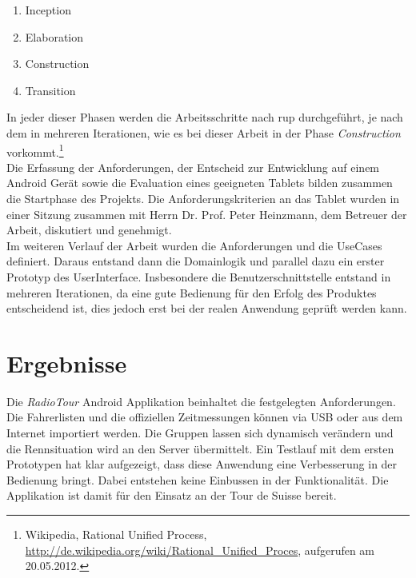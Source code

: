 \begin{enumerate}
\item Inception
\item Elaboration
\item Construction
\item Transition
\end{enumerate}

In jeder dieser Phasen werden die Arbeitsschritte nach \gls{rup} durchgeführt, je nach dem in mehreren Iterationen, wie es bei dieser Arbeit in der Phase \textit{Construction} vorkommt.\footnote{Wikipedia, Rational Unified Process,  \url{http://de.wikipedia.org/wiki/Rational_Unified_Proces}, aufgerufen am 20.05.2012.}
\\
Die Erfassung der Anforderungen, der Entscheid zur Entwicklung auf einem Android Gerät sowie die Evaluation eines geeigneten Tablets bilden zusammen die Startphase des Projekts. Die Anforderungskriterien an das Tablet wurden in einer Sitzung zusammen mit Herrn Dr. Prof. Peter Heinzmann, dem Betreuer der Arbeit, diskutiert und genehmigt.
\\
Im weiteren Verlauf der Arbeit wurden die Anforderungen und die UseCases definiert. Daraus entstand dann die Domainlogik und parallel dazu ein erster Prototyp des UserInterface. Insbesondere die Benutzerschnittstelle entstand in mehreren Iterationen, da eine gute Bedienung für den Erfolg des Produktes entscheidend ist, dies jedoch erst bei der realen Anwendung geprüft werden kann.

\section*{Ergebnisse}
Die \textit{RadioTour} Android Applikation beinhaltet die festgelegten Anforderungen. Die Fahrerlisten und die offiziellen Zeitmessungen können via USB oder aus dem Internet importiert werden. Die Gruppen lassen sich dynamisch verändern und die Rennsituation wird an den Server übermittelt. Ein Testlauf mit dem ersten Prototypen hat klar aufgezeigt, dass diese Anwendung eine Verbesserung in der Bedienung bringt. Dabei entstehen keine Einbussen in der Funktionalität. Die Applikation ist damit für den Einsatz an der Tour de Suisse bereit.